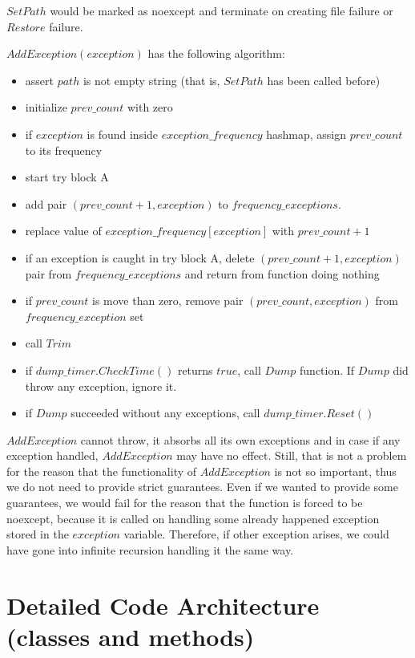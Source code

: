 \documentclass{article}
\begin{document}
$SetPath$ would be marked as noexcept and terminate on creating file failure or $Restore$ failure.

$AddException(exception)$ has the following algorithm:
\begin{itemize}
	\item assert $path$ is not empty string (that is, $SetPath$ has been called before)
	\item initialize $prev\_count$ with zero
	\item if $exception$ is found inside $exception\_frequency$ hashmap, assign $prev\_count$ to its frequency
	\item start try block A
	\item add pair $(prev\_count + 1, exception)$ to $frequency\_exceptions$.
	\item replace value of $exception\_frequency[exception]$ with $prev\_count + 1$
	\item if an exception is caught in try block A, delete  $(prev\_count + 1, exception)$ pair from $frequency\_exceptions$ and return from function doing nothing
	\item if $prev\_count$ is move than zero, remove pair $(prev\_count, exception)$ from $frequency\_exception$ set
	\item call $Trim$
	\item if $dump\_timer.CheckTime()$ returns $true$, call $Dump$ function. If $Dump$ did throw any exception, ignore it.
	\item if $Dump$ succeeded without any exceptions, call $dump\_timer.Reset()$
\end{itemize}

$AddException$ cannot throw, it absorbs all its own exceptions and in case if any exception handled, $AddException$ may have no effect. Still, that is not a problem for the reason that the functionality of $AddException$ is not so important, thus we do not need to provide strict guarantees. Even if we wanted to provide some guarantees, we would fail for the reason that the function is forced to be noexcept, because it is called on handling some already happened exception stored in the $exception$ variable. Therefore, if other exception arises, we could have gone into infinite recursion handling it the same way.

\newpage
\section{Detailed Code Architecture (classes and methods)}
\end{document}
